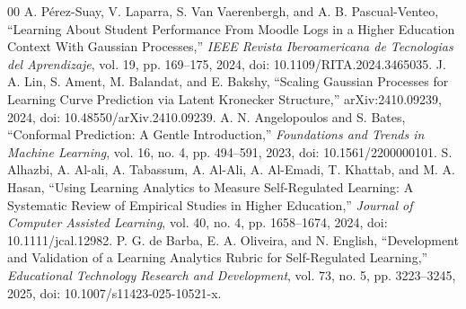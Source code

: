 \documentclass[conference]{IEEEtran}
\begin{document}
\begin{thebibliography}{00}
 A. P\'erez-Suay, V. Laparra, S. Van Vaerenbergh, and A. B. Pascual-Venteo, ``Learning About Student Performance From Moodle Logs in a Higher Education Context With Gaussian Processes,'' \textit{IEEE Revista Iberoamericana de Tecnologias del Aprendizaje}, vol. 19, pp. 169--175, 2024, doi: 10.1109/RITA.2024.3465035.
 J. A. Lin, S. Ament, M. Balandat, and E. Bakshy, ``Scaling Gaussian Processes for Learning Curve Prediction via Latent Kronecker Structure,'' arXiv:2410.09239, 2024, doi: 10.48550/arXiv.2410.09239.
 A. N. Angelopoulos and S. Bates, ``Conformal Prediction: A Gentle Introduction,'' \textit{Foundations and Trends in Machine Learning}, vol. 16, no. 4, pp. 494--591, 2023, doi: 10.1561/2200000101.
 S. Alhazbi, A. Al-ali, A. Tabassum, A. Al-Ali, A. Al-Emadi, T. Khattab, and M. A. Hasan, ``Using Learning Analytics to Measure Self-Regulated Learning: A Systematic Review of Empirical Studies in Higher Education,'' \textit{Journal of Computer Assisted Learning}, vol. 40, no. 4, pp. 1658--1674, 2024, doi: 10.1111/jcal.12982.
 P. G. de Barba, E. A. Oliveira, and N. English, ``Development and Validation of a Learning Analytics Rubric for Self-Regulated Learning,'' \textit{Educational Technology Research and Development}, vol. 73, no. 5, pp. 3223--3245, 2025, doi: 10.1007/s11423-025-10521-x.
\end{thebibliography}
\end{document}
